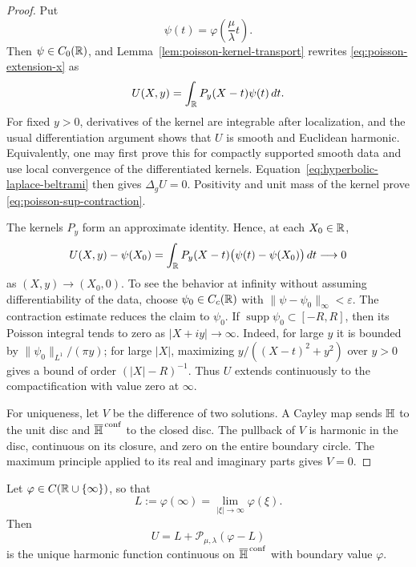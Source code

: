 \begin{proof}
Put
\[
 \psi(t)=\varphi\left(\frac{\mu}{\lambda}t\right).
\]
Then $\psi\in C_0(\mathbb{R})$, and Lemma~\ref{lem:poisson-kernel-transport}
rewrites \eqref{eq:poisson-extension-x} as
\begin{equation}\label{eq:poisson-extension-X}
 U(X,y)=\int_{\mathbb{R}}P_y(X-t)\psi(t)\,dt.
\end{equation}
For fixed $y>0$, derivatives of the kernel are integrable after localization,
and the usual differentiation argument shows that $U$ is smooth and
Euclidean harmonic.  Equivalently, one may first prove this for compactly
supported smooth data and use local convergence of the differentiated
kernels.  Equation~\eqref{eq:hyperbolic-laplace-beltrami} then gives
$\Delta_gU=0$.  Positivity and unit mass of the kernel prove
\eqref{eq:poisson-sup-contraction}.

The kernels $P_y$ form an approximate identity.  Hence, at each
$X_0\in\mathbb{R}$,
\[
 U(X,y)-\psi(X_0)
 =\int_{\mathbb{R}}P_y(X-t)\bigl(\psi(t)-\psi(X_0)\bigr)\,dt
 \longrightarrow0
\]
as $(X,y)\to(X_0,0)$.  To see the behavior at infinity without assuming
differentiability of the data, choose $\psi_0\in C_c(\mathbb{R})$ with
$\|\psi-\psi_0\|_\infty<\varepsilon$.  The contraction estimate reduces the
claim to $\psi_0$.  If $\operatorname{supp}\psi_0\subset[-R,R]$, then its
Poisson integral tends to zero as $|X+iy|\to\infty$.  Indeed, for large $y$
it is bounded by $\|\psi_0\|_{L^1}/(\pi y)$; for large $|X|$, maximizing
$y/((X-t)^2+y^2)$ over $y>0$ gives a bound of order
$(|X|-R)^{-1}$.  Thus $U$ extends continuously to the compactification with
value zero at $\infty$.

For uniqueness, let $V$ be the difference of two solutions.  A Cayley map
sends $\mathbb{H}$ to the unit disc and $\overline{\mathbb{H}}^{\,\mathrm{conf}}$ to the
closed disc.  The pullback of $V$ is harmonic in the disc, continuous on its
closure, and zero on the entire boundary circle.  The maximum principle
applied to its real and imaginary parts gives $V=0$.
\end{proof}

\begin{corollary}
\label{cor:continuous-compactified-dirichlet}
Let $\varphi\in C(\mathbb{R}\cup\{\infty\})$, so that
\[
 L:=\varphi(\infty)=\lim_{|\xi|\to\infty}\varphi(\xi).
\]
Then
\[
 U=L+\mathcal P_{\mu,\lambda}(\varphi-L)
\]
is the unique harmonic function continuous on
$\overline{\mathbb{H}}^{\,\mathrm{conf}}$ with boundary value $\varphi$.
\end{corollary}

